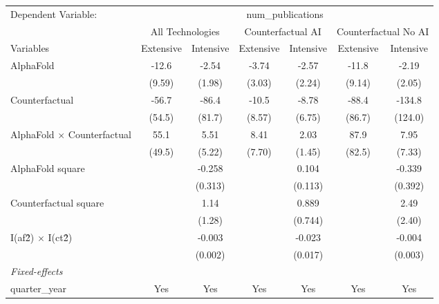 \begingroup
\centering
\begin{tabular}{lcccccc}
   \tabularnewline \midrule \midrule
   Dependent Variable: & \multicolumn{6}{c}{num\_publications}\\
 & \multicolumn{2}{c}{All Technologies} & \multicolumn{2}{c}{Counterfactual AI} & \multicolumn{2}{c}{Counterfactual No AI} \\
\cmidrule(lr){1-1}\cmidrule(lr){2-3} \cmidrule(lr){4-5} \cmidrule(lr){6-7}
Variables & \multicolumn{1}{c}{Extensive} & \multicolumn{1}{c}{Intensive} & \multicolumn{1}{c}{Extensive} & \multicolumn{1}{c}{Intensive} & \multicolumn{1}{c}{Extensive} & \multicolumn{1}{c}{Intensive} \\
\cmidrule(lr){1-1}\cmidrule(lr){2-2} \cmidrule(lr){3-3} \cmidrule(lr){4-4} \cmidrule(lr){5-5} \cmidrule(lr){6-6} \cmidrule(lr){7-7}
   AlphaFold                          & -12.6  & -2.54   & -3.74  & -2.57   & -11.8  & -2.19\\   
                                      & (9.59) & (1.98)  & (3.03) & (2.24)  & (9.14) & (2.05)\\   
   Counterfactual                     & -56.7  & -86.4   & -10.5  & -8.78   & -88.4  & -134.8\\   
                                      & (54.5) & (81.7)  & (8.57) & (6.75)  & (86.7) & (124.0)\\   
   AlphaFold $\times$ Counterfactual  & 55.1   & 5.51    & 8.41   & 2.03    & 87.9   & 7.95\\   
                                      & (49.5) & (5.22)  & (7.70) & (1.45)  & (82.5) & (7.33)\\   
   AlphaFold square                   &        & -0.258  &        & 0.104   &        & -0.339\\   
                                      &        & (0.313) &        & (0.113) &        & (0.392)\\   
   Counterfactual square              &        & 1.14    &        & 0.889   &        & 2.49\\   
                                      &        & (1.28)  &        & (0.744) &        & (2.40)\\   
   I(af\^2) $\times$ I(ct\^2)         &        & -0.003  &        & -0.023  &        & -0.004\\   
                                      &        & (0.002) &        & (0.017) &        & (0.003)\\   
   \midrule
   \emph{Fixed-effects}\\
   quarter\_year                      & Yes    & Yes     & Yes    & Yes     & Yes    & Yes\\  

\end{tabular}
